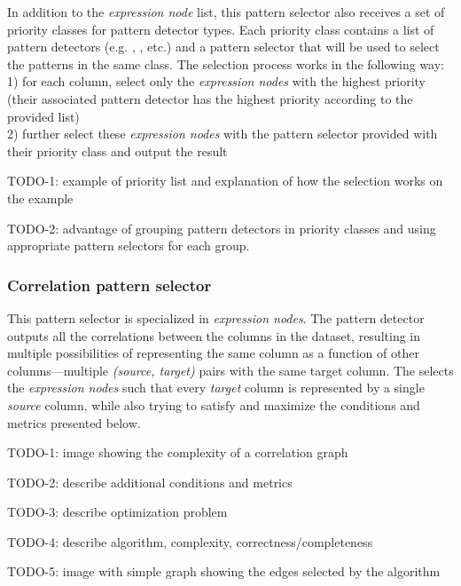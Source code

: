 In addition to the \textit{expression node} list, this pattern selector also receives a set of priority classes for pattern detector types. Each priority class contains a list of pattern detectors (e.g. , , etc.) and a pattern selector that will be used to select the patterns in the same class. The selection process works in the following way:\\
1) for each column, select only the \textit{expression nodes} with the highest priority (their associated pattern detector has the highest priority according to the provided list)\\
2) further select these \textit{expression nodes} with the pattern selector provided with their priority class and output the result

TODO-1: example of priority list and explanation of how the selection works on the example

TODO-2: advantage of grouping pattern detectors in priority classes and using appropriate pattern selectors for each group.

\subsubsection{Correlation pattern selector}
\label{subsubsec:ps:correlation}

This pattern selector is specialized in  \textit{expression nodes}. The  pattern detector outputs all the correlations between the columns in the dataset, resulting in multiple possibilities of representing the same column as a function of other columns---multiple \textit{(source, target)} pairs with the same target column. The  selects the \textit{expression nodes} such that every \textit{target} column is represented by a single \textit{source} column, while also trying to satisfy and maximize the conditions and metrics presented below.

TODO-1: image showing the complexity of a correlation graph

TODO-2: describe additional conditions and metrics

TODO-3: describe optimization problem

TODO-4: describe algorithm, complexity, correctness/completeness

TODO-5: image with simple graph showing the edges selected by the algorithm


